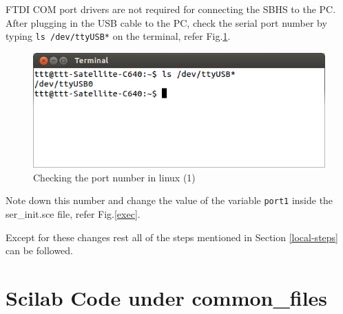 FTDI COM port drivers are not required for connecting the SBHS to the PC. After plugging in the USB cable to the PC, check the serial port number by typing {\tt ls /dev/ttyUSB*} on the terminal, refer Fig.\ref{lstty}.
\begin{figure}
\centering
\includegraphics[width=0.7\linewidth]{using-sbhs/lstty.png}
\caption{Checking the port number in linux (1)}
\label{lstty}
\end{figure}

Note down this number and change the value of the variable {\tt port1} inside the {ser\_init.sce} file, refer Fig.\ref{exec}. 

 Except for these changes rest all of the steps mentioned in Section \ref{local-steps} can be followed.

\section{Scilab Code under common\_files}\label{commonfiles}
\begin{code}

\end{code}

\begin{code}

\end{code}

\begin{code}

\end{code}




